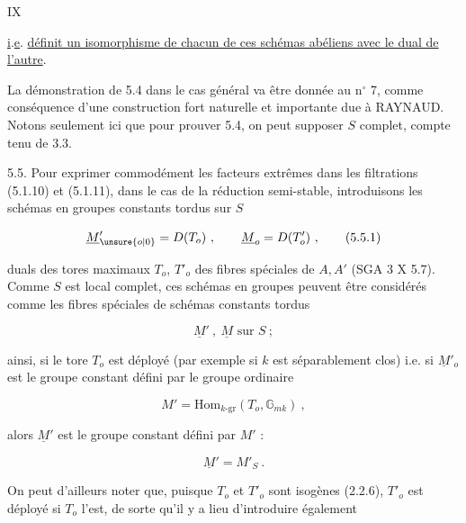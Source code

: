 \hfill IX

\uline{i}.\uline{e}. \uline{définit un isomorphisme de chacun de ces schémas abéliens avec le dual de l'autre}.

La démonstration de 5.4 dans le cas général va être donnée au n$^\circ$ 7, comme conséquence d'une construction fort naturelle et importante due à RAYNAUD. Notons seulement ici que pour prouver 5.4, on peut supposer $S$ complet, compte tenu de 3.3.

5.5. Pour exprimer commodément les facteurs extrêmes dans les filtrations (5.1.10) et (5.1.11), dans le cas de la réduction semi-stable, introduisons les schémas en groupes constants tordus sur $S$

\[
\underline{M}'_{\unsure{o|0}}=D(T_o)\ ,\qquad\underline{M}_o=D(T'_o)\ ,\tag*{(5.5.1)}
\]

duals des tores maximaux $T_o$, $T'_o$ des fibres spéciales de $A,A'$ (SGA 3 X 5.7). Comme $S$ est local complet, ces schémas en groupes peuvent être considérés comme les fibres spéciales de schémas constants tordus

\[
\underline{M}'\ ,\ \underline{M}\text{ sur }S\ ;\tag*{(5.5.2)}
\]

ainsi, si le tore $T_o$ est déployé (par exemple si $k$ est séparablement clos) i.e. si $\underline{M}'_o$ est le groupe constant défini par le groupe ordinaire

\[
M'=\mathrm{Hom}_{k\text{-}\mathrm{gr}}(T_o,\mathbb{G}_{mk})\ ,\tag*{(5.5.3)}
\]

alors $\underline{M}'$ est le groupe constant défini par $M'$ :

\[
\underline{M}'=M'_S\ .
\]

On peut d'ailleurs noter que, puisque $T_o$ et $T'_o$ sont isogènes (2.2.6), $T'_o$ est déployé si $T_o$ l'est, de sorte qu'il y a lieu d'introduire également

